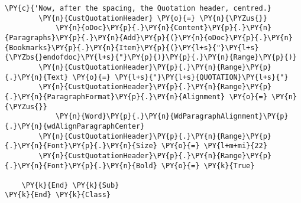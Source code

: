 \begin{Verbatim}[commandchars=\\\{\}]
        \PY{c}{'Now, after the spacing, the Quotation header, centred.}
        \PY{n}{CustQuotationHeader} \PY{o}{=} \PY{n}{\PYZus{}}
            \PY{n}{oDoc}\PY{p}{.}\PY{n}{Content}\PY{p}{.}\PY{n}{Paragraphs}\PY{p}{.}\PY{n}{Add}\PY{p}{(}\PY{n}{oDoc}\PY{p}{.}\PY{n}{Bookmarks}\PY{p}{.}\PY{n}{Item}\PY{p}{(}\PY{l+s}{"}\PY{l+s}{\PYZbs{}endofdoc}\PY{l+s}{"}\PY{p}{)}\PY{p}{.}\PY{n}{Range}\PY{p}{)}
        \PY{n}{CustQuotationHeader}\PY{p}{.}\PY{n}{Range}\PY{p}{.}\PY{n}{Text} \PY{o}{=} \PY{l+s}{"}\PY{l+s}{QUOTATION}\PY{l+s}{"}
        \PY{n}{CustQuotationHeader}\PY{p}{.}\PY{n}{Range}\PY{p}{.}\PY{n}{ParagraphFormat}\PY{p}{.}\PY{n}{Alignment} \PY{o}{=} \PY{n}{\PYZus{}}
            \PY{n}{Word}\PY{p}{.}\PY{n}{WdParagraphAlignment}\PY{p}{.}\PY{n}{wdAlignParagraphCenter}
        \PY{n}{CustQuotationHeader}\PY{p}{.}\PY{n}{Range}\PY{p}{.}\PY{n}{Font}\PY{p}{.}\PY{n}{Size} \PY{o}{=} \PY{l+m+mi}{22}
        \PY{n}{CustQuotationHeader}\PY{p}{.}\PY{n}{Range}\PY{p}{.}\PY{n}{Font}\PY{p}{.}\PY{n}{Bold} \PY{o}{=} \PY{k}{True}

    \PY{k}{End} \PY{k}{Sub}
\PY{k}{End} \PY{k}{Class}
\end{Verbatim}